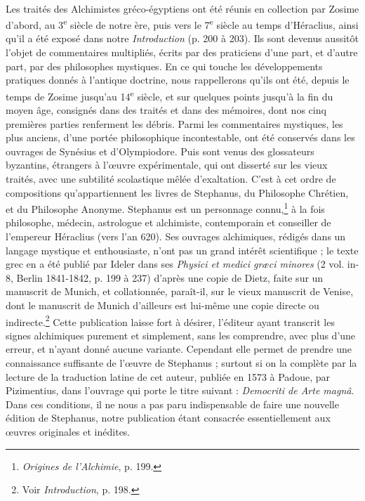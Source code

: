 \documentclass[a4paper, 11pt, oneside, polutonikogreek, french]{article}
\begin{document}
\paragraph{}
Les traités des Alchimistes gréco-égyptiens ont été réunis en collection par Zosime d'abord, au 3\textsuperscript{e} siècle de notre ère, puis vers le 7\textsuperscript{e} siècle au temps d'Héraclius, ainsi qu'il a été exposé dans notre \emph{Introduction} (p. 200 à 203). Ils sont devenus aussitôt l'objet de commentaires multipliés, écrits par des praticiens d'une part, et d'autre part, par des philosophes mystiques. En ce qui touche les développements pratiques donnés à l'antique doctrine, nous rappellerons qu'ils ont été, depuis le temps de Zosime jusqu'au 14\textsuperscript{e} siècle, et sur quelques points jusqu'à la fin du moyen âge, consignés dans des traités et dans des mémoires, dont nos cinq premières parties renferment les débris. Parmi les commentaires mystiques, les plus anciens, d'une portée philosophique incontestable, ont été conservés dans les ouvrages de Synésius et d'Olympiodore. Puis sont venus des glossateurs byzantins, étrangers à l'œuvre expérimentale, qui ont disserté sur les vieux traités, avec une subtilité scolastique mêlée d'exaltation. C'est à cet ordre de compositions qu'appartiennent les livres de Stephanus, du Philosophe Chrétien, et du Philosophe Anonyme. Stephanus est un personnage connu,\footnote{\emph{Origines de l'Alchimie}, p. 199.} à la fois philosophe, médecin, astrologue et alchimiste, contemporain et conseiller de l'empereur Héraclius (vers l'an 620). Ses ouvrages alchimiques, rédigés dans un langage mystique et enthousiaste, n'ont pas un grand intérêt scientifique ; le texte grec en a été publié par Ideler dans ses \emph{Physici et medici græci minores} (2 vol. in-8, Berlin 1841-1842, p. 199 à 237) d'après une copie de Dietz, faite sur un manuscrit de Munich, et collationnée, paraît-il, sur le vieux manuscrit de Venise, dont le manuscrit de Munich d'ailleurs est lui-même une copie directe ou indirecte.\footnote{Voir \emph{Introduction}, p. 198.} Cette publication laisse fort à désirer, l'éditeur ayant transcrit les signes alchimiques purement et simplement, sans les comprendre, avec plus d'une erreur, et n'ayant donné aucune variante. Cependant elle permet de prendre une connaissance suffisante de l'œuvre de Stephanus ; surtout si on la complète par la lecture de la traduction latine de cet auteur, publiée en 1573 à Padoue, par Pizimentius, dans l'ouvrage qui porte le titre suivant : \emph{Democriti de Arte magnâ}. Dans ces conditions, il ne nous a pas paru indispensable de faire une nouvelle édition de Stephanus, notre publication étant consacrée essentiellement aux œuvres originales et inédites.
\end{document}
